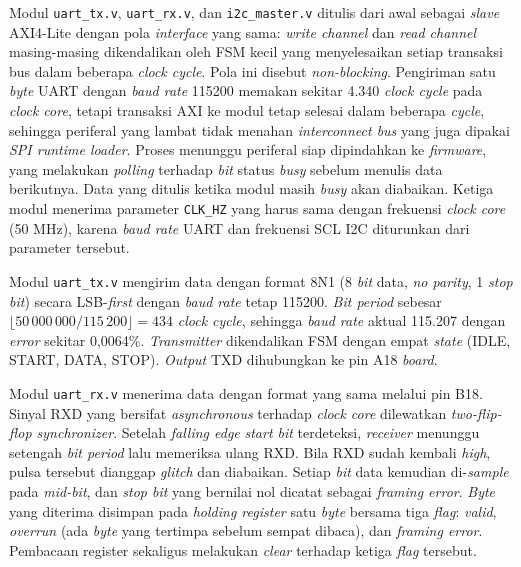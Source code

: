 Modul \texttt{uart\_tx.v}, \texttt{uart\_rx.v}, dan \texttt{i2c\_master.v} ditulis dari awal sebagai \textit{slave} AXI4-Lite dengan pola \textit{interface} yang sama: \textit{write channel} dan \textit{read channel} masing-masing dikendalikan oleh FSM kecil yang menyelesaikan setiap transaksi bus dalam beberapa \textit{clock cycle}. Pola ini disebut \textit{non-blocking}. Pengiriman satu \textit{byte} UART dengan \textit{baud rate} 115200 memakan sekitar 4.340 \textit{clock cycle} pada \textit{clock core}, tetapi transaksi AXI ke modul tetap selesai dalam beberapa \textit{cycle}, sehingga periferal yang lambat tidak menahan \textit{interconnect bus} yang juga dipakai \textit{SPI runtime loader}. Proses menunggu periferal siap dipindahkan ke \textit{firmware}, yang melakukan \textit{polling} terhadap \textit{bit} status \textit{busy} sebelum menulis data berikutnya. Data yang ditulis ketika modul masih \textit{busy} akan diabaikan. Ketiga modul menerima parameter \texttt{CLK\_HZ} yang harus sama dengan frekuensi \textit{clock core} (50 MHz), karena \textit{baud rate} UART dan frekuensi SCL I2C diturunkan dari parameter tersebut.

Modul \texttt{uart\_tx.v} mengirim data dengan format 8N1 (8 \textit{bit} data, \textit{no parity}, 1 \textit{stop bit}) secara LSB-\textit{first} dengan \textit{baud rate} tetap 115200. \textit{Bit period} sebesar $\lfloor 50\,000\,000/115\,200 \rfloor = 434$ \textit{clock cycle}, sehingga \textit{baud rate} aktual 115.207 dengan \textit{error} sekitar 0,0064\%. \textit{Transmitter} dikendalikan FSM dengan empat \textit{state} (IDLE, START, DATA, STOP). \textit{Output} TXD dihubungkan ke pin A18 \textit{board}.

Modul \texttt{uart\_rx.v} menerima data dengan format yang sama melalui pin B18. Sinyal RXD yang bersifat \textit{asynchronous} terhadap \textit{clock core} dilewatkan \textit{two-flip-flop synchronizer}. Setelah \textit{falling edge} \textit{start bit} terdeteksi, \textit{receiver} menunggu setengah \textit{bit period} lalu memeriksa ulang RXD. Bila RXD sudah kembali \textit{high}, pulsa tersebut dianggap \textit{glitch} dan diabaikan. Setiap \textit{bit} data kemudian di-\textit{sample} pada \textit{mid-bit}, dan \textit{stop bit} yang bernilai nol dicatat sebagai \textit{framing error}. \textit{Byte} yang diterima disimpan pada \textit{holding register} satu \textit{byte} bersama tiga \textit{flag}: \textit{valid}, \textit{overrun} (ada \textit{byte} yang tertimpa sebelum sempat dibaca), dan \textit{framing error}. Pembacaan register sekaligus melakukan \textit{clear} terhadap ketiga \textit{flag} tersebut.


